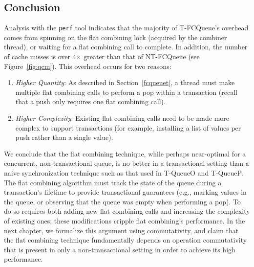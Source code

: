 \subsection{Conclusion}
Analysis with the \texttt{perf} tool indicates that the majority of T-FCQueue's overhead comes from spinning on the flat combining lock (acquired by the combiner thread), or waiting for a flat combining call to complete. In addition, the number of cache misses is over 4$\times$ greater than that of NT-FCQueue (see Figure~\ref{fig:qcm}). This overhead occurs for two reasons:
\begin{enumerate}
    \item \emph{Higher Quantity}: As described in Section~\ref{fcqueuet}, a thread must make multiple flat combining calls to perform a pop within a transaction (recall that a push only requires one flat combining call).
    \item \emph{Higher Complexity}: Existing flat combining calls need to be made more complex to support transactions (for example, installing a list of values per push rather than a single value).
\end{enumerate}

We conclude that the flat combining technique, while perhaps near-optimal for a concurrent, non-transactional queue, is no better in a transactional setting than a naive synchronization technique such as that used in T-QueueO and T-QueueP. The flat combining algorithm must track the state of the queue during a transaction's lifetime to provide transactional guarantees (e.g., marking values in the queue, or observing that the queue was empty when performing a pop). To do so requires both adding new flat combining calls and increasing the complexity of existing ones; these modifications cripple flat combining's performance.
In the next chapter, we formalize this argument using commutativity, and claim that the flat combining technique fundamentally depends on operation commutativity that is present in only a non-transactional setting in order to achieve its high performance. 
